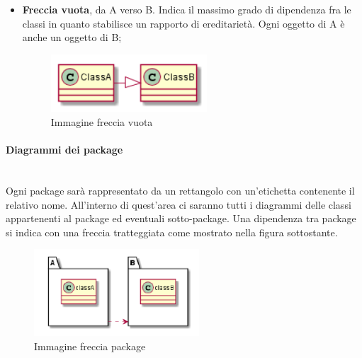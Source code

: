 \begin{itemize}
\begin{figure}[H]
   	\end{figure}
    \item \textbf{Freccia vuota}, da A verso B. Indica il massimo grado di dipendenza fra le classi in quanto stabilisce un rapporto di ereditarietà. Ogni oggetto di A è anche un oggetto di B;
    \begin{figure}[H]
    	\begin{center}
	    	\includegraphics[width=0.55\textwidth]{../includes/pics/frecciavuota.png}
	    	\caption{Immagine freccia vuota}
    	\end{center}
   	\end{figure}
\end{itemize}
\paragraph{Diagrammi dei package}\mbox{}\\[0.4cm]
Ogni package sarà rappresentato da un rettangolo con un'etichetta contenente il relativo nome. All'interno di quest'area ci saranno tutti i diagrammi delle classi appartenenti al package ed eventuali sotto-package. Una dipendenza tra package si indica con una freccia tratteggiata come mostrato nella figura sottostante.
\begin{figure}[H]
	\begin{center}
		\includegraphics[width=0.55\textwidth]{../includes/pics/packagefreccia.png}
		\caption{Immagine freccia package}
	\end{center}
\end{figure}
